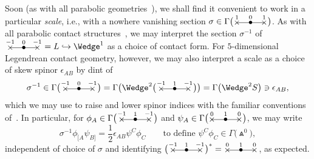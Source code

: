 \documentclass[10pt,a4paper]{amsart}
\numberwithin{equation}{section}
\newcommand{\xox}[3]{\begin{picture}(40,11)
\put(4,1.5){\makebox(0,0){$\times$}}
\put(20,1.5){\makebox(0,0){$\bullet$}}
\put(36,1.5){\makebox(0,0){$\times$}}
\put(4,1.5){\line(1,0){32}}
\put(4,8){\makebox(0,0){$\scriptstyle #1$}}
\put(20,8){\makebox(0,0){$\scriptstyle #2$}}
\put(36,8){\makebox(0,0){$\scriptstyle #3$}}
\end{picture}}
\begin{document}
Soon (as with all parabolic geometries~\cite{CSweyl}), we shall find it
convenient to work in a particular {\em scale}, i.e., with a nowhere vanishing
section $\sigma\in\Gamma\big(\xox{1}{0}{1}\big)$. As with all parabolic contact
structures~\cite[Section~4.2]{CS}, we may interpret the section $\sigma^{-1}$ of
$\,\xox{-1}{0}{-1}\,=L\hookrightarrow\Wedge^1$ as a choice of contact form.
For $5$-dimensional Legendrean contact geometry, however, we may also interpret
a scale as a choice of skew spinor $\epsilon_{AB}$ by dint of
\begin{equation}\label{epsilon}\sigma^{-1}\in\Gamma\big(\,\xox{-1}{0}{-1}\,\big)
=\Gamma\big(\Wedge^2\big(\,\xox{-1}{1}{-1}\,\big)\big)=\Gamma\big(\Wedge^2S\big)
\ni\epsilon_{AB},\end{equation} which we may use to raise and lower spinor
indices with the familiar conventions of~\cite{OT}. In particular, for
$\phi_A\in\Gamma\big(\,\xox{-1}{1}{-1}\,\big)$ and $\psi_A\in\Gamma\big(\xox{0}{1}{0}\big)$, we
may write
\[\textstyle\sigma^{-1}\phi_{[A}\psi_{B]}=\frac12\epsilon_{AB}\psi^C\phi_C
\qquad\mbox{to define }\psi^C\phi_C\in\Gamma\big(\Wedge^0\big),\]
independent of choice of $\sigma$ and identifying
$\big(\,\xox{-1}{1}{-1}\,\big)^*=\xox{0}{1}{0}$, as expected.
\end{document}
